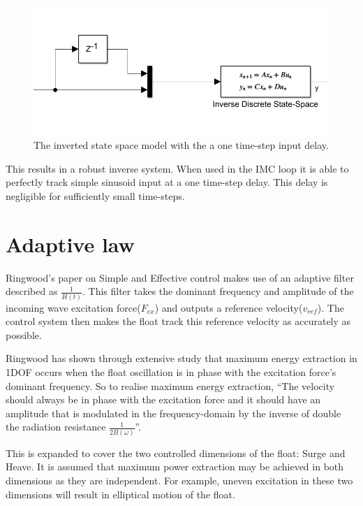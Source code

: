 \documentclass{report}
\begin{document}
\begin{figure}
\centering
\label{fig:inverseSS}
\includegraphics[scale=0.5]{graphics/inverseSS}
\caption{The inverted state space model with the a one time-step input delay.}
\end{figure}

This results in a robust inverse system. When used in the IMC loop it is able to perfectly track simple sinusoid input at a one time-step delay. This delay is negligible for sufficiently small time-steps.

\section{Adaptive law}
\label{adaptiveLawSection}
Ringwood's paper\cite{ringwood} on Simple and Effective control makes use of an adaptive filter described as 
$\frac{1}{H(t)}$.  This filter takes the dominant frequency and amplitude of the incoming wave excitation force($F_{ex}$) and outputs a reference velocity($v_{ref}$). The control system then makes the float track this reference velocity as accurately as possible.

Ringwood has shown through extensive study that maximum energy extraction in 1DOF occurs when the float oscillation is in phase with the excitation force's dominant frequency\cite{ringwood}. So to realise maximum energy extraction, ``The velocity should always be in phase with the excitation force and it should have an amplitude that is modulated in the frequency-domain by the inverse of double the radiation resistance $\frac{1}{2B(\omega)}$''\cite{ringwood}.

This is expanded to cover the two controlled dimensions of the float: Surge and Heave. It is assumed that maximum power extraction may be achieved in both dimensions as they are independent. For example, uneven excitation in these two dimensions will result in elliptical motion of the float.
\end{document}
